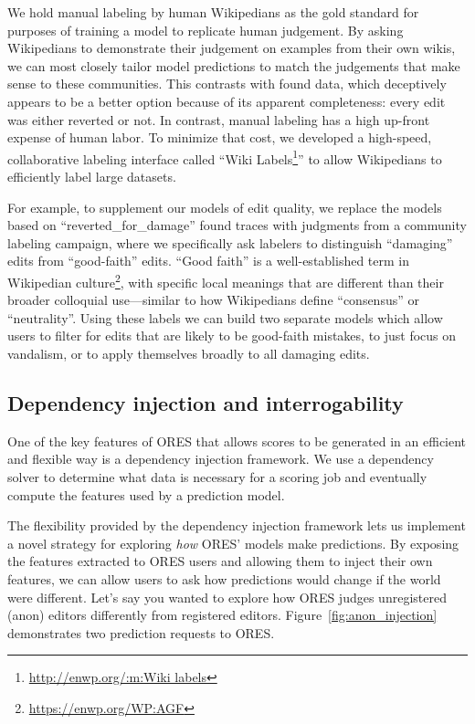 %
We hold manual labeling by human Wikipedians as the gold standard for purposes of training a model to replicate human judgement.  By asking Wikipedians to demonstrate their judgement on examples from their own wikis, we can most closely tailor model predictions to match the judgements that make sense to these communities.  This contrasts with found data, which deceptively appears to be a better option because of its apparent completeness: every edit was either reverted or not.  In contrast, manual labeling has a high up-front expense of human labor.  To minimize that cost, we developed a high-speed, collaborative labeling interface called ``Wiki Labels\footnote{\url{http://enwp.org/:m:Wiki labels}}'' to allow Wikipedians to efficiently label large datasets.

For example, to supplement our models of edit quality, we replace the models based on ``reverted\_for\_damage'' found traces with judgments from a community labeling campaign, where we specifically ask labelers to distinguish ``damaging'' edits from ``good-faith'' edits. ``Good faith'' is a well-established term in Wikipedian culture\footnote{\url{https://enwp.org/WP:AGF}}, with specific local meanings that are different than their broader colloquial use---similar to how Wikipedians define ``consensus'' or ``neutrality''.  Using these labels we can build two separate models which allow users to filter for edits that are likely to be good-faith mistakes\cite{halfaker2017automated}, to just focus on vandalism, or to apply themselves broadly to all damaging edits.

\subsection{Dependency injection and interrogability}
One of the key features of ORES that allows scores to be generated in an efficient and flexible way is a dependency injection framework.  We use a dependency solver to determine what data is necessary for a scoring job and eventually compute the features used by a prediction model.

The flexibility provided by the dependency injection framework lets us implement a novel strategy for exploring \emph{how} ORES' models make predictions.  By exposing the features extracted to ORES users and allowing them to inject their own features, we can allow users to ask how predictions would change if the world were different.  Let's say you wanted to explore how ORES judges unregistered (anon) editors differently from registered editors.  Figure~\ref{fig:anon_injection} demonstrates two prediction requests to ORES.

